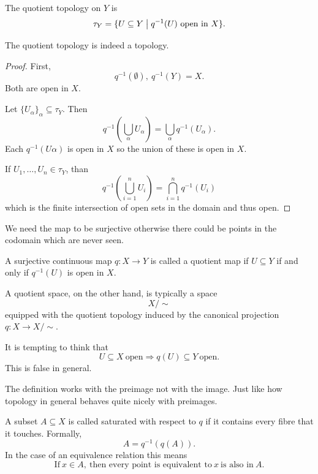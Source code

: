 \documentclass[11pt]{article}
\begin{document}
\begin{defn}
    The quotient topology on $Y$ is 
    \[
        \tau_Y = \{U \subseteq Y \bigm| q^{-1}(U) \ \text{open 
        in} \ X\}. 
    \]
\end{defn} 


\begin{prop}
    The quotient topology is indeed a topology. 
\end{prop}
\begin{proof}
    First, 
    \[
        q^{-1}(\emptyset), \ q^{-1}(Y) = X. 
    \]
    Both are open in $X$. 

    Let $\{U_\alpha\}_\alpha \subseteq \tau_Y$. Then 
    \[
        q^{-1}\left(\bigcup_\alpha U_\alpha\right) 
        = \bigcup_\alpha q^{-1}(U_\alpha). 
    \]
    Each $q^{-1}(U\alpha)$ is open in $X$ so 
    the union of these is open in $X$. 

    If $U_1,\ldots,U_n \in \tau_Y$, than 
    \[
        q^{-1}\left(\bigcup_{i=1}^n U_i\right)
        = \bigcap_{i=1}^n q^{-1}(U_i)
    \]
    which is the finite intersection of open sets in 
    the domain and thus open. 
\end{proof}

We need the map to be surjective otherwise 
there could be points in the codomain which 
are never seen. 

A surjective continuous map $q : X \to Y$ is called 
a quotient map if $U \subseteq Y$ if and only if $q^{-1}(U)$
is open in $X$. 

A quotient space, on the other hand, is 
typically a space 
\[
    X/\sim
\]
equipped with the quotient topology induced by 
the canonical projection $q : X \to X/\sim$. 

It is tempting to think that 
\[
    U \subseteq X \ \text{open} 
    \Rightarrow q(U) \subseteq Y \ \text{open}.
\]
This is false in general.

The definition works with the preimage not with the 
image. Just like how topology in general behaves quite 
nicely with preimages. 

\begin{defn}
    A subset $A \subseteq X$ is called saturated 
    with respect to $q$ if it contains 
    every fibre that it touches. 
    Formally, 
    \[
            A = q^{-1}(q(A)). 
    \]
    In the case of an equivalence relation this means 
    \[
        \text{If} \ x \in A, \ \text{then every 
        point is equivalent to} \ x \ \text{is also in} \ A.
    \]
\end{defn}
\end{document}
